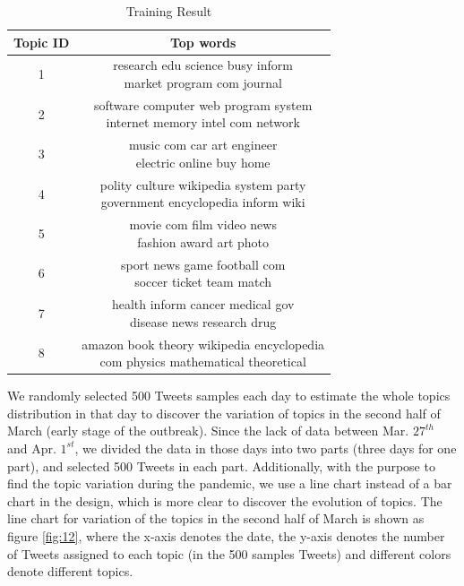 \begin{table}[htbp]
\centering
\begin{tabular}{|c|c|}
\hline
Topic ID & Top words\\
\hline
1 & \tabincell{l}{research edu science busy inform \\market program com journal}\\
\hline
2 & \tabincell{l}{software computer web program system \\internet memory intel com network}\\
\hline
3 & \tabincell{l}{music com car art engineer \\electric online buy home}\\
\hline
4 & \tabincell{l}{polity culture wikipedia system party \\government encyclopedia inform wiki}\\
\hline
5 & \tabincell{l}{movie com film video news \\fashion award art photo}\\
\hline
6 & \tabincell{l}{sport news game football com \\soccer ticket team match}\\
\hline
7 & \tabincell{l}{health inform cancer medical gov \\disease news research drug}\\
\hline
8 & \tabincell{l}{amazon book theory wikipedia encyclopedia \\com physics mathematical theoretical}\\
\hline
\end{tabular}
\caption{Training Result}
\label{table_6}
\end{table}

We randomly selected 500 Tweets samples each day to estimate the whole topics distribution in that day to discover the variation of topics in the second half of March (early stage of the outbreak). Since the lack of data between Mar. $27^{th}$ and Apr. $1^{st}$, we divided the data in those days into two parts (three days for one part), and selected 500 Tweets in each part. Additionally, with the purpose to find the topic variation during the pandemic, we use a line chart instead of a bar chart in the design, which is more clear to discover the evolution of topics. The line chart for variation of the topics in the second half of March is shown as figure \ref{fig:12}, where the x-axis denotes the date, the y-axis denotes the number of Tweets assigned to each topic (in the 500 samples Tweets) and different colors denote different topics. 

